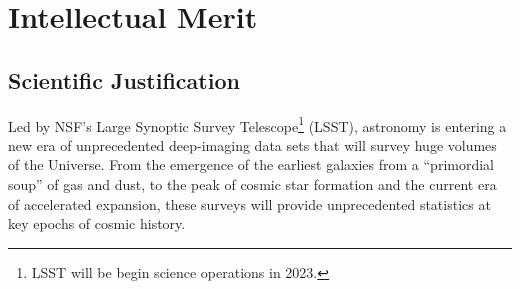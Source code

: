 \documentclass[oneside,11pt]{amsart}
\begin{document}


\noindent{}

\section{Intellectual Merit}
\label{sec:im}

\subsection{Scientific Justification} 

Led by NSF's Large Synoptic Survey Telescope\footnote{
%
LSST will be begin science operations in 2023.}
%
(LSST), astronomy is entering a new era of unprecedented deep-imaging data sets that will survey huge volumes of the
Universe.  From the emergence of the earliest galaxies from a ``primordial soup'' of gas and dust, to the peak of
cosmic star formation and the current era of accelerated expansion, these surveys will provide unprecedented statistics
at key epochs of cosmic history.
\end{document}
